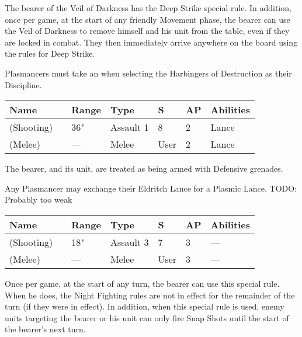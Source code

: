 
The bearer of the Veil of Darkness has the Deep Strike special rule. In addition, once per game, at the start of any friendly Movement phase, the bearer can use the Veil of Darkness to remove himself and his unit from the table, even if they are locked in combat. They then immediately arrive anywhere on the board using the rules for Deep Strike.




Plasmancers must take an  when selecting the Harbingers of Destruction as their Discipline.

\label{Eldritch Lance}
\noindent
\begin{tabular}{||m{130pt} m{10pt} m{31pt} m{55pt} m{12pt} m{12pt} m{210pt}||}
	\hline
	Name & & Range & Type & S & AP & Abilities \\
	\hline
	\quickref{Eldritch Lance} (Shooting) & & 36" & Assault 1 & 8 & 2 & Lance \\
	\quickref{Eldritch Lance} (Melee) & & — & Melee & User & 2 & Lance \\
	\hline
\end{tabular}


The bearer, and its unit, are treated as being armed with Defensive grenades.


Any Plasmancer may exchange their Eldritch Lance for a Plasmic Lance.
TODO: Probably too weak

\label{Plasmic Lance}
\noindent
\begin{tabular}{||m{130pt} m{10pt} m{31pt} m{55pt} m{12pt} m{12pt} m{210pt}||}
	\hline
	Name & & Range & Type & S & AP & Abilities \\
	\hline
	\quickref{Plasmic Lance} (Shooting) & & 18" & Assault 3 & 7 & 3 & — \\
	\quickref{Plasmic Lance} (Melee) & & — & Melee & User & 3 & — \\
	\hline
\end{tabular}


Once per game, at the start of any turn, the bearer can use this special rule. When he does, the Night Fighting rules are not in effect for the remainder of the turn (if they were in effect). In addition, when this special rule is used, enemy units targeting the bearer or his unit can only fire Snap Shots until the start of the bearer’s next turn.

